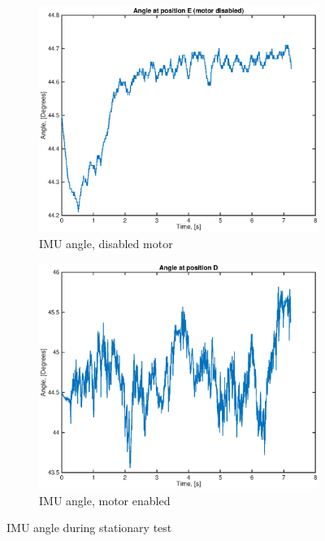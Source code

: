 \documentclass[a4paper,11pt]{kth-mag}
\begin{document}
\begin{figure}[!htb]
\centering
\begin{subfigure}{.5\textwidth}
  \centering
  \includegraphics[width=\textwidth]{result1.eps}
  \caption{IMU angle, disabled motor}
  \label{Fig: diabled motor}
\end{subfigure}%
\begin{subfigure}{.5\textwidth}
  \centering
  \includegraphics[width=\textwidth]{result2.eps}
  \caption{IMU angle, motor enabled}
  \label{Fig: enabled motor}
\end{subfigure}
\caption{IMU angle during stationary test}
\label{Fig: Result1}
\end{figure}
\end{document}
